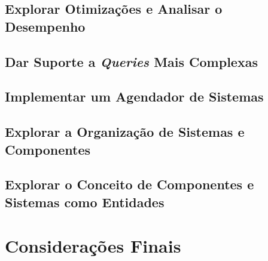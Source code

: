 \subsection{Explorar Otimizações e Analisar o Desempenho}

\subsection{Dar Suporte a \textit{Queries} Mais Complexas}

\subsection{Implementar um Agendador de Sistemas}

\subsection{Explorar a Organização de Sistemas e Componentes}

\subsection{Explorar o Conceito de Componentes e Sistemas como Entidades}

\section{Considerações Finais}
